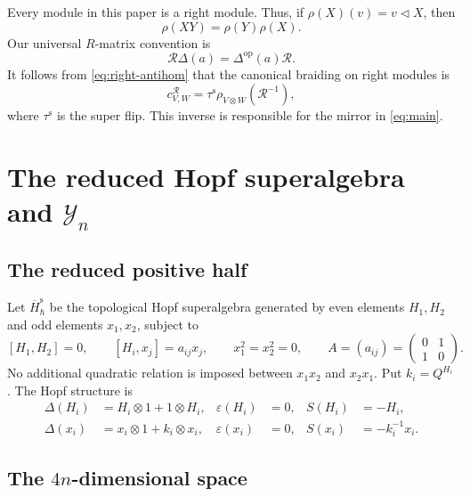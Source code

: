 \documentclass[11pt,a4paper]{article}
\newcommand{\ot}{\otimes}
\newcommand{\tri}{\mathbin{\triangleleft}}
\theoremstyle{definition}
\theoremstyle{remark}
\begin{document}
Every module in this paper is a right module.  Thus, if
\(\rho(X)(v)=v\tri X\), then
\begin{equation}\label{eq:right-antihom}
 \rho(XY)=\rho(Y)\rho(X).
\end{equation}
Our universal \(R\)-matrix convention is
\begin{equation}\label{eq:R-convention}
 \mathcal R\Delta(a)=\Delta^{\mathrm{op}}(a)\mathcal R.
\end{equation}
It follows from \eqref{eq:right-antihom} that the canonical braiding on
right modules is
\begin{equation}\label{eq:right-braiding}
 c^{\mathcal R}_{V,W}
 =\tau^{\mathrm s}\rho_{V\ot W}(\mathcal R^{-1}),
\end{equation}
where \(\tau^{\mathrm s}\) is the super flip.  This inverse is responsible
for the mirror in \cref{eq:main}.

\section[The reduced Hopf superalgebra and Yn]
{The reduced Hopf superalgebra and \(\mathcal Y_n\)}
\label{sec:reduced}

\subsection{The reduced positive half}

Let \(\overline H_\hbar^{\mathrm s}\) be the topological Hopf
superalgebra generated by even elements \(H_1,H_2\) and odd elements
\(x_1,x_2\), subject to
\begin{equation}\label{eq:positive-relations}
 [H_1,H_2]=0,\qquad
 [H_i,x_j]=a_{ij}x_j,\qquad x_1^2=x_2^2=0,
 \qquad
 A=(a_{ij})=\begin{pmatrix}0&1\\1&0\end{pmatrix}.
\end{equation}
No additional quadratic relation is imposed between \(x_1x_2\) and
\(x_2x_1\).  Put \(k_i=Q^{H_i}\).  The Hopf structure is
\begin{equation}\label{eq:positive-Hopf}
\begin{aligned}
 \Delta(H_i)&=H_i\ot1+1\ot H_i,
 &\varepsilon(H_i)&=0,
 &S(H_i)&=-H_i,\\
 \Delta(x_i)&=x_i\ot1+k_i\ot x_i,
 &\varepsilon(x_i)&=0,
 &S(x_i)&=-k_i^{-1}x_i.
\end{aligned}
\end{equation}
\subsection[The 4n-dimensional space]{The \(4n\)-dimensional space}
\end{document}
